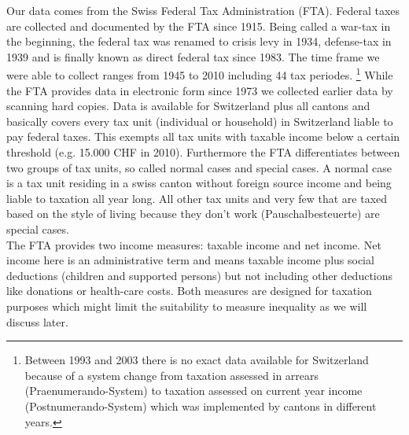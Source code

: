 \documentclass[twoside]{article}\usepackage[]{graphicx}\usepackage[]{color}
\begin{document}
\begin{multicols}{2}
Our data comes from the Swiss Federal Tax Administration (FTA). Federal taxes are collected and documented by the FTA since 1915. Being called a war-tax in the beginning, the federal tax was renamed to crisis levy in 1934, defense-tax in 1939 and is finally known as direct federal tax since 1983. The time frame we were able to collect ranges from 1945 to 2010 including 44 tax periodes. \footnote{Between 1993 and 2003 there is no exact data available for Switzerland because of a system change from taxation assessed in arrears (Praenumerando-System) to taxation assessed on current year income (Postnumerando-System) which was implemented by cantons in different years.}  While the FTA provides data in electronic form since 1973 we collected earlier data by scanning hard copies. Data is available for Switzerland plus all cantons and basically covers every tax unit (individual or household) in Switzerland liable to pay federal taxes. This exempts all tax units with taxable income below a certain threshold (e.g. 15.000 CHF in 2010). Furthermore the FTA differentiates between two groups of tax units, so called normal cases and special cases. A normal case is a tax unit residing in a swiss canton without foreign source income and being liable to taxation all year long. All other tax units and very few that are taxed based on the style of living because they don't work (Pauschalbesteuerte) are special cases. \\

The FTA provides two income measures: taxable income and net income. Net income here is an administrative term and means taxable income plus social deductions (children and supported persons) but not including other deductions like donations or health-care costs. Both measures are designed for taxation purposes which might limit the suitability to measure inequality as we will discuss later.




\end{multicols}
\end{document}
